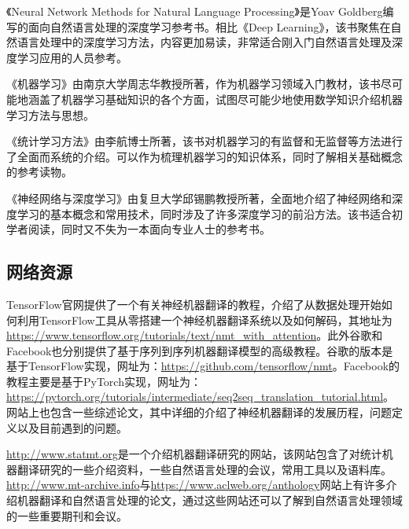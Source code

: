\parinterval 《Neural Network Methods for Natural Language Processing》\cite{goldberg2017neural}是Yoav Goldberg编写的面向自然语言处理的深度学习参考书。相比《Deep Learning》，该书聚焦在自然语言处理中的深度学习方法，内容更加易读，非常适合刚入门自然语言处理及深度学习应用的人员参考。

\parinterval 《机器学习》\cite{周志华2016机器学习}由南京大学周志华教授所著，作为机器学习领域入门教材，该书尽可能地涵盖了机器学习基础知识的各个方面，试图尽可能少地使用数学知识介绍机器学习方法与思想。

\parinterval 《统计学习方法》\cite{李航2012统计学习方法}由李航博士所著，该书对机器学习的有监督和无监督等方法进行了全面而系统的介绍。可以作为梳理机器学习的知识体系，同时了解相关基础概念的参考读物。

\parinterval 《神经网络与深度学习》\cite{邱锡鹏2020神经网络与深度学习}由复旦大学邱锡鹏教授所著，全面地介绍了神经网络和深度学习的基本概念和常用技术，同时涉及了许多深度学习的前沿方法。该书适合初学者阅读，同时又不失为一本面向专业人士的参考书。

\subsection{网络资源}

\parinterval  TensorFlow官网提供了一个有关神经机器翻译的教程，介绍了从数据处理开始如何利用TensorFlow工具从零搭建一个神经机器翻译系统以及如何解码，其地址为\url{https://www.tensorflow.org/tutorials/text/nmt\_with\_attention}。此外谷歌和Facebook也分别提供了基于序列到序列机器翻译模型的高级教程。谷歌的版本是基于TensorFlow实现，网址为：\url{https://github.com/tensorflow/nmt}。Facebook的教程主要是基于PyTorch实现，网址为：\url{https://pytorch.org/tutorials/intermediate/seq2seq\_translation\_tutorial.html}。网站上也包含一些综述论文，其中详细的介绍了神经机器翻译的发展历程，问题定义以及目前遇到的问题。

\parinterval  \url{http://www.statmt.org}是一个介绍机器翻译研究的网站，该网站包含了对统计机器翻译研究的一些介绍资料，一些自然语言处理的会议，常用工具以及语料库。\url{http://www.mt-archive.info}与\url{https://www.aclweb.org/anthology}网站上有许多介绍机器翻译和自然语言处理的论文，通过这些网站还可以了解到自然语言处理领域的一些重要期刊和会议。

